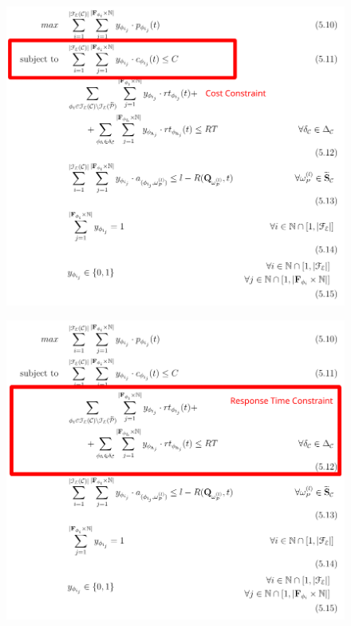 \documentclass[13.5pt]{beamer}
\begin{document}
\begin{frame}
	
	\begin{figure}[h]
		\centering
		\includegraphics[width=\textwidth,height=0.8\columnwidth]{../Images/MMKPForSlide2.png}
	\end{figure}
	
	
\end{frame}



\begin{frame}
	
	\begin{figure}[h]
		\centering
		\includegraphics[width=\textwidth,height=0.8\columnwidth]{../Images/MMKPForSlide3.png}
	\end{figure}
	
	
\end{frame}
\end{document}
